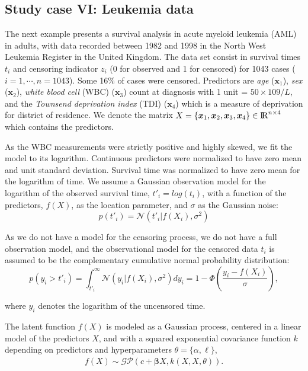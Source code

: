 \documentclass[]{interact}
\theoremstyle{plain}%
\theoremstyle{definition}
\theoremstyle{remark}
\begin{document}
\subsection{Study case VI: Leukemia data}\label{sec:bf_caseVI}
The next example presents a survival analysis in acute myeloid leukemia (AML) in adults, with data recorded between 1982 and 1998 in the North West Leukemia Register in the United Kingdom. The data set consist in survival times $t_i$ and censoring indicator $z_i$ (0 for observed and 1 for censored) for 1043 cases ($i=1,\cdots,n=1043$). Some 16\% of cases were censored. Predictors are \textit{age} ($\bm{x}_1$), \textit{sex} ($\bm{x}_2$), \textit{white blood cell} (WBC) ($\bm{x}_3$) count at diagnosis with 1 unit = $50\times109/L$, and the \textit{Townsend deprivation index} (TDI) ($\bm{x}_4$) which is a measure of deprivation for district of residence. We denote the matrix $X=\{\bm{x}_1,\bm{x}_2,\bm{x}_3,\bm{x}_4\} \in {\rm I\!R}^{n\times 4}$ which contains the predictors.

As the WBC measurements were strictly positive and highly skewed, we fit the model to its logarithm. Continuous predictors were normalized to have zero mean and unit standard deviation. Survival time was normalized to have zero mean for the logarithm of time. We assume a Gaussian observation model for the logarithm of the observed survival time, $t'_i=log(t_i)$, with a function of the predictors, $f(X)$, as the location parameter, and $\sigma$ as the Gaussian noise: 
%
\begin{equation*}
p(t'_i)= \mathcal{N}(t'_i|f(X_i),\sigma^2)
\end{equation*}

As we do not have a model for the censoring process, we do not have a full observation model, and the observational model for the censored data $t_i$ is assumed to be the complementary cumulative normal probability distribution:
%
\begin{equation*}
p(y_i > t'_i)= \int_{t'_i}^{\infty} \mathcal{N}(y_i|f(X_i),\sigma^2) dy_i=  1 - \Phi \left( \frac{y_i-f(X_i)}{\sigma} \right),
\end{equation*}

\noindent where $y_i$ denotes the logarithm of the uncensored time.

The latent function $f(X)$ is modeled as a Gaussian process, centered in a linear model of the predictors $X$, and with a squared exponential covariance function $k$ depending on predictors and hyperparameters $\theta=\{\alpha,\ell\}$,
%
\begin{eqnarray*} 
f(X) \sim \mathcal{GP}(c + \bm{\beta}X, k(X,X, \theta)).
\end{eqnarray*}
\end{document}
